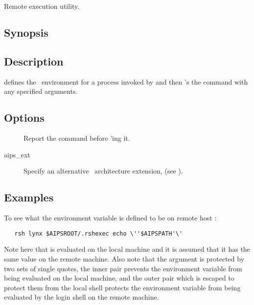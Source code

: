 \newpage
\section{}
\label{.rshexec}

Remote execution utility.

\subsection*{Synopsis}

\begin{synopsis}
\end{synopsis}

\subsection*{Description}

 defines the \aipspp\ environment for a process invoked by
 and then 's the command with any specified
arguments.

\subsection*{Options}

\begin{description}
\item[]
   Report the command before 'ing it.

\item[ aips\_ext]
   Specify an alternative \aipspp\ architecture extension, 
   (see ).
\end{description}

\subsection*{Examples}

To see what the  environment variable is defined to be on
remote host :

\begin{verbatim}
   rsh lynx $AIPSROOT/.rshexec echo \''$AIPSPATH'\'
\end{verbatim}

\noindent
Note here that  is evaluated on the local machine and it is
assumed that it has the same value on the remote machine.  Also note that the
 argument is protected by two sets of single quotes, the
inner pair prevents the environment variable from being evaluated on the local
machine, and the outer pair which is escaped to protect them from the local
shell protects the environment variable from being evaluated by the login
shell on the remote machine.

